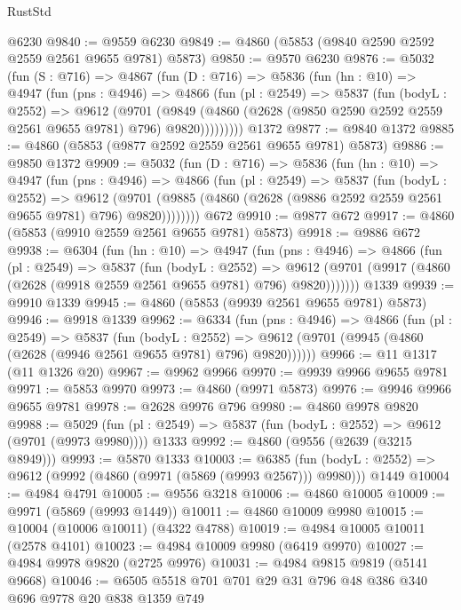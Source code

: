 \begin{lexlean}{RustStd}
\begin{coremodule}
    @6230
@9840 := @9559 @6230
@9849 := @4860 (@5853 (@9840 @2590 @2592 @2559 @2561 @9655 @9781) @5873)
@9850 := @9570 @6230
@9876 := @5032
    (fun (S : @716) =>
    @4867
      (fun (D : @716) =>
      @5836
        (fun (hn : @10) =>
        @4947
          (fun (pns : @4946) =>
          @4866
            (fun (pl : @2549) =>
            @5837
              (fun (bodyL : @2552) =>
              @9612
                (@9701
                  (@9849
                    (@4860 (@2628 (@9850 @2590 @2592 @2559 @2561 @9655 @9781) @796) @9820)))))))))
    @1372
@9877 := @9840 @1372
@9885 := @4860 (@5853 (@9877 @2592 @2559 @2561 @9655 @9781) @5873)
@9886 := @9850 @1372
@9909 := @5032
    (fun (D : @716) =>
    @5836
      (fun (hn : @10) =>
      @4947
        (fun (pns : @4946) =>
        @4866
          (fun (pl : @2549) =>
          @5837
            (fun (bodyL : @2552) =>
            @9612
              (@9701 (@9885 (@4860 (@2628 (@9886 @2592 @2559 @2561 @9655 @9781) @796) @9820))))))))
    @672
@9910 := @9877 @672
@9917 := @4860 (@5853 (@9910 @2559 @2561 @9655 @9781) @5873)
@9918 := @9886 @672
@9938 := @6304
    (fun (hn : @10) =>
    @4947
      (fun (pns : @4946) =>
      @4866
        (fun (pl : @2549) =>
        @5837
          (fun (bodyL : @2552) =>
          @9612 (@9701 (@9917 (@4860 (@2628 (@9918 @2559 @2561 @9655 @9781) @796) @9820)))))))
    @1339
@9939 := @9910 @1339
@9945 := @4860 (@5853 (@9939 @2561 @9655 @9781) @5873)
@9946 := @9918 @1339
@9962 := @6334
    (fun (pns : @4946) =>
    @4866
      (fun (pl : @2549) =>
      @5837
        (fun (bodyL : @2552) =>
        @9612 (@9701 (@9945 (@4860 (@2628 (@9946 @2561 @9655 @9781) @796) @9820))))))
@9966 := @11 @1317 (@11 @1326 @20)
@9967 := @9962 @9966
@9970 := @9939 @9966 @9655 @9781
@9971 := @5853 @9970
@9973 := @4860 (@9971 @5873)
@9976 := @9946 @9966 @9655 @9781
@9978 := @2628 @9976 @796
@9980 := @4860 @9978 @9820
@9988 := @5029
    (fun (pl : @2549) => @5837 (fun (bodyL : @2552) => @9612 (@9701 (@9973 @9980))))
    @1333
@9992 := @4860 (@9556 (@2639 (@3215 @8949)))
@9993 := @5870 @1333
@10003 := @6385
    (fun (bodyL : @2552) => @9612 (@9992 (@4860 (@9971 (@5869 (@9993 @2567))) @9980)))
    @1449
@10004 := @4984 @4791
@10005 := @9556 @3218
@10006 := @4860 @10005
@10009 := @9971 (@5869 (@9993 @1449))
@10011 := @4860 @10009 @9980
@10015 := @10004 (@10006 @10011) (@4322 @4788)
@10019 := @4984 @10005 @10011 (@2578 @4101)
@10023 := @4984 @10009 @9980 (@6419 @9970)
@10027 := @4984 @9978 @9820 (@2725 @9976)
@10031 := @4984 @9815 @9819 (@5141 @9668)
@10046 := @6505 @5518 @701 @701 @29 @31 @796 @48 @386 @340 @696 @9778 @20 @838 @1359 @749

\end{coremodule}
\end{lexlean}
